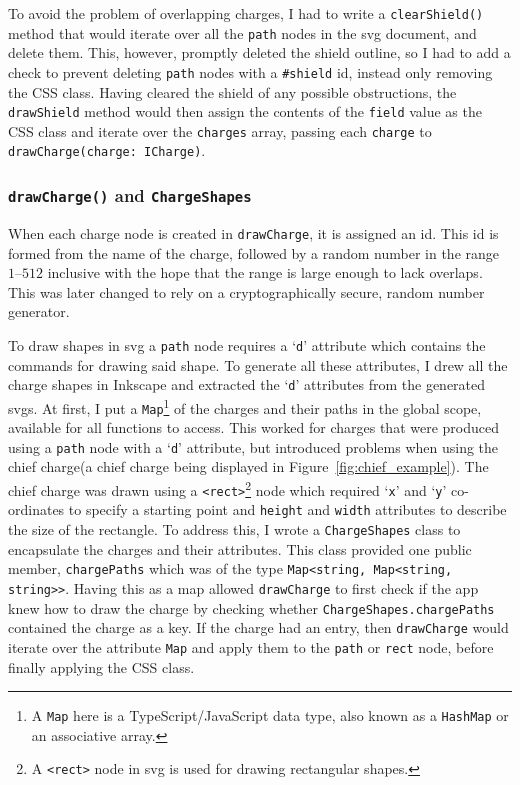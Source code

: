 \documentclass[nobib, a4paper, twoside, justified]{tufte-book}
\makeatletter
\newcommand{\svg}{\gls{svg}\@\xspace}
\newcommand{\svgs}{\glspl{svg}\@\xspace}
\newcommand{\charge}{\gls{charge}\@\xspace}
\newcommand{\charges}{\glspl{charge}\@\xspace}
\makeatother
\begin{document}
To avoid the problem of overlapping \charges, I had to write a \texttt{clearShield()} method that
would iterate over all the \texttt{path} nodes in the \svg document, and delete them. This,
however, promptly deleted the shield outline, so I had to add a check to prevent deleting
\texttt{path} nodes with a \texttt{\#shield} id, instead only removing the CSS class. Having
cleared the shield of any possible obstructions, the \texttt{drawShield} method would then assign
the contents of the \texttt{field} value as the CSS class and iterate over the \texttt{\charges}
array, passing each \texttt{\charge} to \texttt{drawCharge(charge: ICharge)}.

\subsubsection{\texttt{drawCharge()} and \texttt{ChargeShapes}}%
\label{ssub:draw_charge}

When each \charge node is created in \texttt{drawCharge}, it is assigned an id. This id is formed
from the name of the charge, followed by a random number in the range $1\text{--}512$ inclusive
with the hope that the range is large enough to lack overlaps. This was later changed to rely on a
cryptographically secure, random number generator.

To draw shapes in \svg a \texttt{path} node requires a `\texttt{d}' attribute which contains the
commands for drawing said shape. To generate all these attributes, I drew all the \charge shapes in
Inkscape and extracted the `\texttt{d}' attributes from the generated \svgs. At first, I put a
\texttt{Map}\footnote{A \texttt{Map} here is a TypeScript/JavaScript data type, also known as a
\texttt{HashMap} or an associative array.} of the \charges and their paths in the global scope,
available for all functions to access. This worked for \charges that were produced using a
\texttt{path} node with a `\texttt{d}' attribute, but introduced problems when using the
chief \charge (a chief \charge being displayed in Figure~\ref{fig:chief_example}). The
chief \charge was drawn using a \texttt{<rect>}\footnote{A \texttt{<rect>} node in \svg is used for
drawing rectangular shapes.} node which required `\texttt{x}' and `\texttt{y}'
co-ordinates to specify a starting point and \texttt{height} and \texttt{width} attributes to
describe the size of the rectangle. To address this, I wrote a \texttt{ChargeShapes} class to
encapsulate the \charges and their attributes. This class provided one public member,
\texttt{chargePaths} which was of the type \texttt{Map<string, Map<string, string>\hphantom>}.
Having this as a map allowed \texttt{drawCharge} to first check if the app knew how to draw the
\charge by checking whether \texttt{ChargeShapes.chargePaths} contained the \charge as a key.  If
the \charge had an entry, then \texttt{drawCharge} would iterate over the attribute \texttt{Map}
and apply them to the \texttt{path} or \texttt{rect} node, before finally applying the CSS class.
\end{document}
